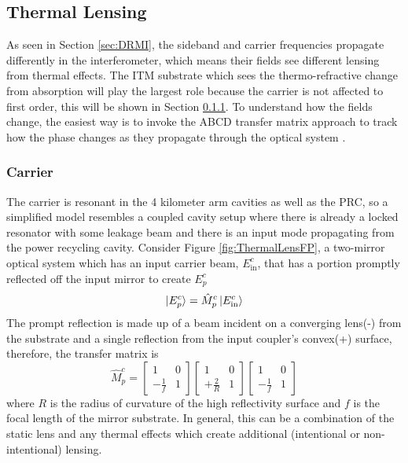 	\subsection{Thermal Lensing}\label{Sec:TL_lensing}
	As seen in Section \ref{sec:DRMI}, the sideband and carrier frequencies propagate differently in the interferometer, which means their fields  see different lensing from thermal effects.  The ITM substrate which sees the thermo-refractive change from absorption will play the largest role because the carrier is not affected to first order, this will be shown in Section \ref{Sec:carrier_lensing}. To understand how the fields change, the easiest way is to invoke the ABCD transfer matrix approach to track how the phase changes as they propagate through the optical system \cite{Lawrence_TCS}.
		\subsubsection{Carrier}\label{Sec:carrier_lensing}
		The carrier is resonant in the 4 kilometer arm cavities as well as the PRC, so a simplified model resembles a coupled cavity setup where there is already a locked resonator with some leakage beam and there is an input mode propagating from the power recycling cavity.  Consider Figure \ref{fig:ThermalLensFP}, a two-mirror optical system which has an input carrier beam, $E^c_{\text{in}}$, that has a portion promptly reflected off the input mirror to create $E^c_{p}$
		\begin{equation}
		\ket{E^{c}_{p}} = \hat{M}^{c}_{p} \ket{E^{c}_{\text{in}}}
		\end{equation}
		The prompt reflection is made up of a beam incident on a converging lens(-) from the substrate and a single reflection from the input coupler's convex(+) surface, therefore, the transfer matrix is
		\begin{equation}
		\hat{M}^{c}_{p} = 
		\begin{bmatrix}
						1 	&	0 
		\\ 	-\frac{1}{f} 	&	1
		\end{bmatrix}
		\begin{bmatrix}
						1 	&	0 
		\\ 	+\frac{2}{R} 	&	1
		\end{bmatrix}
		\begin{bmatrix}
						1 	&	0 
		\\ 	-\frac{1}{f} 	&	1
		\end{bmatrix}
		\end{equation}
		where $R$ is the radius of curvature of the high reflectivity surface and $f$ is the focal length of the mirror substrate. In general, this can be a combination of the static lens and any thermal effects which create additional (intentional or non-intentional) lensing.
		
